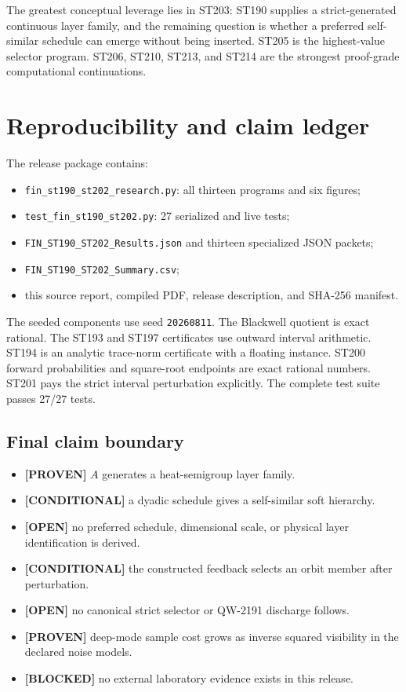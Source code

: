 \documentclass[11pt,a4paper]{article}
\newcommand{\proven}{\textcolor{green!40!black}{\textbf{[PROVEN]}}}
\newcommand{\conditional}{\textcolor{violet!65!black}{\textbf{[CONDITIONAL]}}}
\newcommand{\openstatus}{\textcolor{red!72!black}{\textbf{[OPEN]}}}
\newcommand{\blocked}{\textcolor{orange!82!black}{\textbf{[BLOCKED]}}}
\begin{document}
The greatest conceptual leverage lies in ST203: ST190 supplies a strict-generated continuous layer family, and the remaining question is whether a preferred self-similar schedule can emerge without being inserted. ST205 is the highest-value selector program. ST206, ST210, ST213, and ST214 are the strongest proof-grade computational continuations.

\section{Reproducibility and claim ledger}

The release package contains:
\begin{itemize}
\item \texttt{fin\_st190\_st202\_research.py}: all thirteen programs and six figures;
\item \texttt{test\_fin\_st190\_st202.py}: 27 serialized and live tests;
\item \texttt{FIN\_ST190\_ST202\_Results.json} and thirteen specialized JSON packets;
\item \texttt{FIN\_ST190\_ST202\_Summary.csv};
\item this source report, compiled PDF, release description, and SHA-256 manifest.
\end{itemize}

The seeded components use seed \texttt{20260811}. The Blackwell quotient is exact rational. The ST193 and ST197 certificates use outward interval arithmetic. ST194 is an analytic trace-norm certificate with a floating instance. ST200 forward probabilities and square-root endpoints are exact rational numbers. ST201 pays the strict interval perturbation explicitly. The complete test suite passes 27/27 tests.

\subsection{Final claim boundary}

\begin{itemize}
\item \proven{} $A$ generates a heat-semigroup layer family.
\item \conditional{} a dyadic schedule gives a self-similar soft hierarchy.
\item \openstatus{} no preferred schedule, dimensional scale, or physical layer identification is derived.
\item \conditional{} the constructed feedback selects an orbit member after perturbation.
\item \openstatus{} no canonical strict selector or QW-2191 discharge follows.
\item \proven{} deep-mode sample cost grows as inverse squared visibility in the declared noise models.
\item \blocked{} no external laboratory evidence exists in this release.
\end{itemize}
\end{document}
